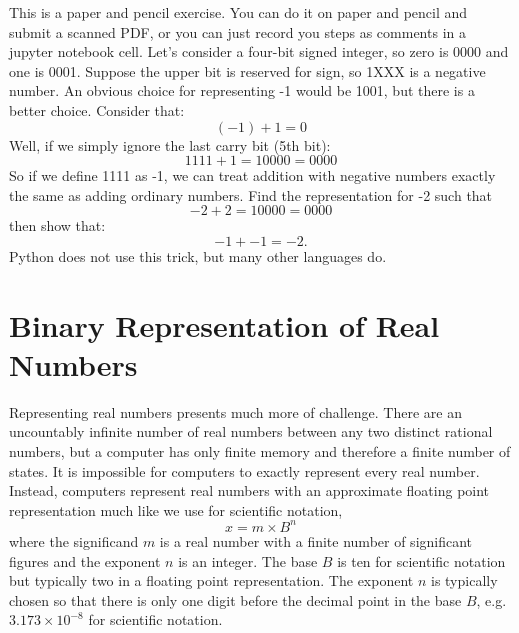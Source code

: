 \plot This is a paper and pencil exercise.  You can do it on paper and
pencil and submit a scanned PDF, or you can just record you steps as
comments in a jupyter notebook cell.  Let's consider a four-bit signed
integer, so zero is 0000 and one is 0001.  Suppose the upper bit is
reserved for sign, so 1XXX is a negative number.  An obvious choice
for representing -1 would be 1001, but there is a better choice.
Consider that:
\begin{displaymath}
(-1) + 1 = 0  
\end{displaymath}
Well, if we simply ignore the last carry bit (5th bit):
\begin{displaymath}
1111 + 1 = 10000 = 0000  
\end{displaymath}
So if we define 1111 as -1, we can treat addition with negative numbers exactly the same as adding ordinary numbers.  Find the representation for -2 such that
\begin{displaymath}
-2 + 2 = 10000 = 0000
\end{displaymath}
then show that:
\begin{displaymath}
-1 + -1 = -2. 
\end{displaymath}
Python does not use this trick, but many other languages do.\\

\section{Binary Representation of Real Numbers}

Representing real numbers presents much more of challenge.  There are
an uncountably infinite number of real numbers between any two
distinct rational numbers, but a computer has only finite memory and
therefore a finite number of states.  It is impossible for computers
to exactly represent every real number.  Instead, computers represent
real numbers with an approximate floating point representation much
like we use for scientific notation,
\begin{displaymath}
x = m \times B^n
\end{displaymath}
where the significand $m$ is a real number with a finite number of
significant figures and the exponent $n$ is an integer.  The base $B$
is ten for scientific notation but typically two in a floating point
representation.  The exponent $n$ is typically chosen so that there is
only one digit before the decimal point in the base $B$, e.g. $3.173
\times 10^{-8}$ for scientific notation.

